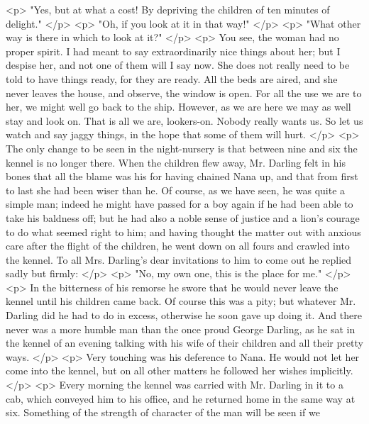     <p>
      "Yes, but at what a cost! By depriving the children of ten minutes of
      delight."
    </p>
    <p>
      "Oh, if you look at it in that way!"
    </p>
    <p>
      "What other way is there in which to look at it?"
    </p>
    <p>
      You see, the woman had no proper spirit. I had meant to say
      extraordinarily nice things about her; but I despise her, and not one of
      them will I say now. She does not really need to be told to have things
      ready, for they are ready. All the beds are aired, and she never leaves
      the house, and observe, the window is open. For all the use we are to her,
      we might well go back to the ship. However, as we are here we may as well
      stay and look on. That is all we are, lookers-on. Nobody really wants us.
      So let us watch and say jaggy things, in the hope that some of them will
      hurt.
    </p>
    <p>
      The only change to be seen in the night-nursery is that between nine and
      six the kennel is no longer there. When the children flew away, Mr.
      Darling felt in his bones that all the blame was his for having chained
      Nana up, and that from first to last she had been wiser than he. Of
      course, as we have seen, he was quite a simple man; indeed he might have
      passed for a boy again if he had been able to take his baldness off; but
      he had also a noble sense of justice and a lion's courage to do what
      seemed right to him; and having thought the matter out with anxious care
      after the flight of the children, he went down on all fours and crawled
      into the kennel. To all Mrs. Darling's dear invitations to him to come out
      he replied sadly but firmly:
    </p>
    <p>
      "No, my own one, this is the place for me."
    </p>
    <p>
      In the bitterness of his remorse he swore that he would never leave the
      kennel until his children came back. Of course this was a pity; but
      whatever Mr. Darling did he had to do in excess, otherwise he soon gave up
      doing it. And there never was a more humble man than the once proud George
      Darling, as he sat in the kennel of an evening talking with his wife of
      their children and all their pretty ways.
    </p>
    <p>
      Very touching was his deference to Nana. He would not let her come into
      the kennel, but on all other matters he followed her wishes implicitly.
    </p>
    <p>
      Every morning the kennel was carried with Mr. Darling in it to a cab,
      which conveyed him to his office, and he returned home in the same way at
      six. Something of the strength of character of the man will be seen if we
